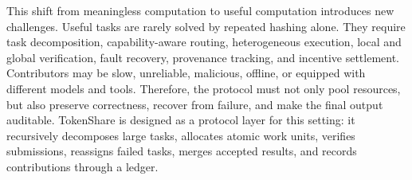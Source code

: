 \documentclass{article}
\theoremstyle{plain}
\begin{document}
This shift from meaningless computation to useful computation introduces new challenges. Useful tasks are rarely solved by repeated hashing alone. They require task decomposition, capability-aware routing, heterogeneous execution, local and global verification, fault recovery, provenance tracking, and incentive settlement. Contributors may be slow, unreliable, malicious, offline, or equipped with different models and tools. Therefore, the protocol must not only pool resources, but also preserve correctness, recover from failure, and make the final output auditable. TokenShare is designed as a protocol layer for this setting: it recursively decomposes large tasks, allocates atomic work units, verifies submissions, reassigns failed tasks, merges accepted results, and records contributions through a ledger.














\end{document}
